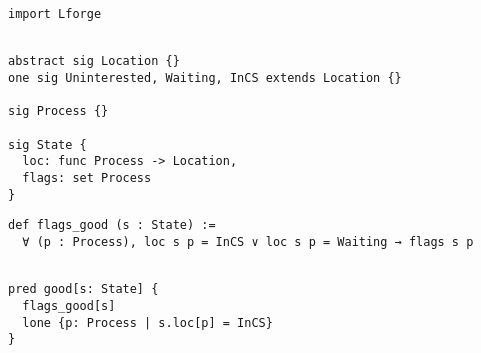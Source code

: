 
{
\setlength{\fboxsep}{4pt}
\begin{tcolorbox}[listing only, minted style=autumn, colback=forgelistingcolor, enhanced, frame hidden, top=0pt, bottom=0pt, left=0pt, right=0pt]
\vspace{-0.5em}
\begin{verbatim}
import Lforge
\end{verbatim}
\vspace{-3.7em}
\begin{verbatim}

abstract sig Location {}
one sig Uninterested, Waiting, InCS extends Location {}

sig Process {}

sig State {
  loc: func Process -> Location,
  flags: set Process
}

\end{verbatim}
\vspace{-3.7em}
\begin{verbatim}
def flags_good (s : State) :=
  ∀ (p : Process), loc s p = InCS ∨ loc s p = Waiting → flags s p
\end{verbatim}
\vspace{-3.7em}
\begin{verbatim}

pred good[s: State] {
  flags_good[s]
  lone {p: Process | s.loc[p] = InCS}
}
\end{verbatim}
\vspace{-2em}
\end{tcolorbox}
}
